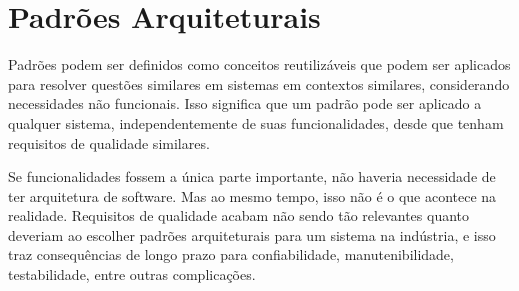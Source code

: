 \section{Padrões Arquiteturais}

Padrões podem ser definidos como conceitos reutilizáveis que podem ser aplicados para resolver questões similares em sistemas em contextos similares, considerando necessidades não funcionais. Isso significa que um padrão pode ser aplicado a qualquer sistema, independentemente de suas funcionalidades, desde que tenham requisitos de qualidade similares.

Se funcionalidades fossem a única parte importante, não haveria necessidade de ter arquitetura de software. Mas ao mesmo tempo, isso não é o que acontece na realidade. Requisitos de qualidade acabam não sendo tão relevantes quanto deveriam ao escolher padrões arquiteturais para um sistema na indústria, e isso traz consequências de longo prazo para confiabilidade, manutenibilidade, testabilidade, entre outras complicações.
